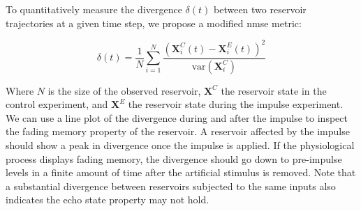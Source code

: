 To quantitatively measure the divergence $\delta(t)$ between two reservoir trajectories at a given time step, we propose a modified \acrshort{nmse} metric:

\begin{equation} \label{methods:reservoir_divergence}
    \delta(t) = \frac{1}{N} \sum_{i=1}^{N} \frac{\left( \mathbf{X}_i^{C}(t) - \mathbf{X}_i^{E}(t) \right)^{2}}{\text{var}\left( \mathbf{X}_i^{C} \right)}
\end{equation}

Where $N$ is the size of the observed reservoir, $\mathbf{X}^{C}$ the reservoir state in the control experiment, and $\mathbf{X}^{E}$ the reservoir state during the impulse experiment.
We can use a line plot of the divergence during and after the impulse to inspect the fading memory property of the reservoir.
A reservoir affected by the impulse should show a peak in divergence once the impulse is applied.
If the physiological process displays fading memory, the divergence should go down to pre-impulse levels in a finite amount of time after the artificial stimulus is removed.
Note that a substantial divergence between reservoirs subjected to the same inputs also indicates the echo state property may not hold.